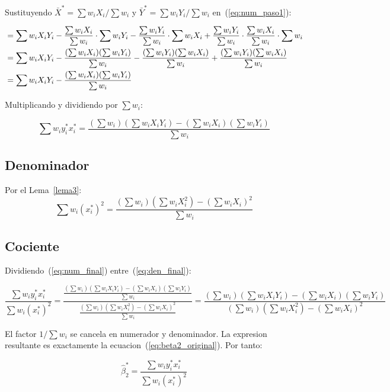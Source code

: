 \documentclass[12pt, letterpaper]{article}
\theoremstyle{remark}
\newcommand{\sw}{\sum w_i}
\newcommand{\swx}{\sum w_i X_i}
\newcommand{\swy}{\sum w_i Y_i}
\newcommand{\swxy}{\sum w_i X_i Y_i}
\newcommand{\swxx}{\sum w_i X_i^2}
\newcommand{\Ybar}{\bar{Y}^*}
\newcommand{\Xbar}{\bar{X}^*}
\newcommand{\ystar}{y_i^*}
\newcommand{\xstar}{x_i^*}
\begin{document}
Sustituyendo $\Xbar = \swx/\sw$ y $\Ybar = \swy/\sw$ en~(\ref{eq:num_paso1}):

\begin{align}
  &= \swxy
   - \frac{\swx}{\sw}\cdot\swy
   - \frac{\swy}{\sw}\cdot\swx
   + \frac{\swy}{\sw}\cdot\frac{\swx}{\sw}\cdot\sw
  \notag\\
  &= \swxy
   - \frac{(\swx)(\swy)}{\sw}
   - \frac{(\swy)(\swx)}{\sw}
   + \frac{(\swy)(\swx)}{\sw}
  \notag\\
  &= \swxy - \frac{(\swx)(\swy)}{\sw}
  \label{eq:num_resultado}
\end{align}

Multiplicando y dividiendo por $\sw$:

\begin{equation}
  \sum w_i \ystar \xstar
    = \frac{(\sw)(\swxy) - (\swx)(\swy)}{\sw}
  \label{eq:num_final}
\end{equation}

\subsection{Denominador}

Por el Lema~\ref{lema3}:
\begin{equation}
  \sum w_i(\xstar)^2
    = \frac{(\sw)(\swxx) - (\swx)^2}{\sw}
  \label{eq:den_final}
\end{equation}

\subsection{Cociente}

Dividiendo~(\ref{eq:num_final}) entre~(\ref{eq:den_final}):

\begin{equation}
  \frac{\sum w_i \ystar \xstar}{\sum w_i(\xstar)^2}
    = \frac{\displaystyle\frac{(\sw)(\swxy) - (\swx)(\swy)}{\sw}}
           {\displaystyle\frac{(\sw)(\swxx) - (\swx)^2}{\sw}}
    = \frac{(\sw)(\swxy) - (\swx)(\swy)}{(\sw)(\swxx) - (\swx)^2}
  \label{eq:cociente}
\end{equation}

El factor $1/\sw$ se cancela en numerador y denominador. La expresion resultante
es exactamente la ecuacion~(\ref{eq:beta2_original}). Por tanto:

\begin{equation}
  \boxed{
    \hat\beta_2^* = \frac{\sum w_i \ystar \xstar}{\sum w_i(\xstar)^2}
  }
  \label{eq:beta2_demostrado}
\end{equation}
\end{document}
